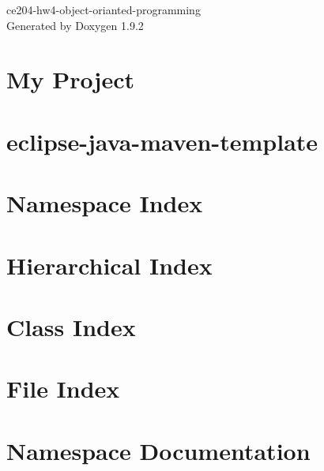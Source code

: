 \documentclass[twoside]{book}
\newcommand{\+}{\discretionary{\mbox{\scriptsize$\hookleftarrow$}}{}{}}
\newcommand{\clearemptydoublepage}{%
    \newpage{\pagestyle{empty}\cleardoublepage}%
  }
\begin{document}
  \raggedbottom
    \hypersetup{pageanchor=false,
                bookmarksnumbered=true,
                pdfencoding=unicode
               }
  \begin{titlepage}
  \vspace*{7cm}
  \begin{center}%
  {\Large ce204-\/hw4-\/object-\/orianted-\/programming}\\
  \vspace*{1cm}
  {\large Generated by Doxygen 1.9.2}\\
  \end{center}
  \end{titlepage}
  \clearemptydoublepage
  \tableofcontents
  \clearemptydoublepage
  \hypersetup{pageanchor=true}
\chapter{My Project}
\label{md_ce204_hw4_src_site_markdown_overview}

\chapter{eclipse-\/java-\/maven-\/template}
\label{md_ce204_hw4_src_site_markdown_readme}

\chapter{Namespace Index}

\chapter{Hierarchical Index}

\chapter{Class Index}

\chapter{File Index}

\chapter{Namespace Documentation}







\end{document}
